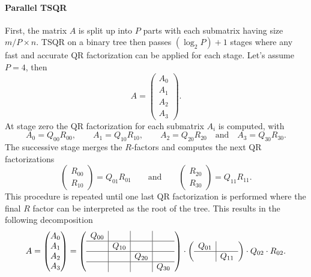 \documentclass{scrartcl}
\numberwithin{equation}{section}
\begin{document}
\paragraph{Parallel TSQR} First, the matrix $A$ is split up into $P$ parts with each submatrix having size $m/P \times n$. TSQR on a binary tree then passes $(\log_2P) + 1$ stages where any fast and accurate QR factorization can be applied for each stage. Let's assume $P = 4$, then 
\begin{equation*}
A =
\begin{pmatrix}
A_0\\A_1\\A_2\\A_3
\end{pmatrix}.
\end{equation*}
At stage zero the QR factorization for each submatrix $A_i$ is computed, with
\begin{equation*}
A_0 = Q_{00}R_{00}, \qquad A_1 = Q_{10}R_{10}, \qquad A_2 = Q_{20}R_{20} \quad \text{and} \quad A_3 = Q_{30}R_{30}.
\end{equation*}
The successive stage merges the $R$-factors and computes the next QR factorizations
\begin{equation*}
\begin{pmatrix}
R_{00} \\
R_{10}
\end{pmatrix} =
Q_{01}R_{01} \qquad \text{and} \qquad
\begin{pmatrix}
R_{20} \\
R_{30}
\end{pmatrix} = 
Q_{11}R_{11}.
\end{equation*}
This procedure is repeated until one last QR factorization is performed where the final $R$ factor can be interpreted as the root of the tree. This results in the following decomposition
\begin{equation} \label{eq:tsqr}
A =
\begin{pmatrix}
A_0\\A_1\\A_2\\A_3
\end{pmatrix} =
\left(
	\begin{array}{c|c|c|c}
	Q_{00} & & & \\
	\hline
	& Q_{10} & & \\
	\hline
	& & Q_{20} & \\
	\hline
	& & & Q_{30}
	\end{array}
	\right) \cdot
\left(
	\begin{array}{c|c}
		Q_{01} & \\
		\hline
		& Q_{11} 
	\end{array}
\right) \cdot
Q_{02} \cdot R_{02}.
\end{equation}
\end{document}
